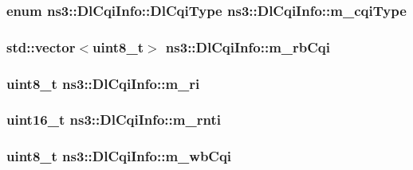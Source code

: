 \subsubsection[{\texorpdfstring{m\+\_\+cqi\+Type}{m_cqiType}}]{\setlength{\rightskip}{0pt plus 5cm}enum {\bf ns3\+::\+Dl\+Cqi\+Info\+::\+Dl\+Cqi\+Type}  ns3\+::\+Dl\+Cqi\+Info\+::m\+\_\+cqi\+Type}\hypertarget{structns3_1_1DlCqiInfo_acd41b20c81bf99ae02444c1f0d1a06ca}{}\label{structns3_1_1DlCqiInfo_acd41b20c81bf99ae02444c1f0d1a06ca}
\subsubsection[{\texorpdfstring{m\+\_\+rb\+Cqi}{m_rbCqi}}]{\setlength{\rightskip}{0pt plus 5cm}std\+::vector$<$uint8\+\_\+t$>$ ns3\+::\+Dl\+Cqi\+Info\+::m\+\_\+rb\+Cqi}\hypertarget{structns3_1_1DlCqiInfo_a326df5503df15cf8a108430902eaf022}{}\label{structns3_1_1DlCqiInfo_a326df5503df15cf8a108430902eaf022}
\subsubsection[{\texorpdfstring{m\+\_\+ri}{m_ri}}]{\setlength{\rightskip}{0pt plus 5cm}uint8\+\_\+t ns3\+::\+Dl\+Cqi\+Info\+::m\+\_\+ri}\hypertarget{structns3_1_1DlCqiInfo_aa772ec4b65a8ef85b674eb9d7940436b}{}\label{structns3_1_1DlCqiInfo_aa772ec4b65a8ef85b674eb9d7940436b}
\subsubsection[{\texorpdfstring{m\+\_\+rnti}{m_rnti}}]{\setlength{\rightskip}{0pt plus 5cm}uint16\+\_\+t ns3\+::\+Dl\+Cqi\+Info\+::m\+\_\+rnti}\hypertarget{structns3_1_1DlCqiInfo_ac255e44a52e27fa8b181f8b4fa627358}{}\label{structns3_1_1DlCqiInfo_ac255e44a52e27fa8b181f8b4fa627358}
\subsubsection[{\texorpdfstring{m\+\_\+wb\+Cqi}{m_wbCqi}}]{\setlength{\rightskip}{0pt plus 5cm}uint8\+\_\+t ns3\+::\+Dl\+Cqi\+Info\+::m\+\_\+wb\+Cqi}\hypertarget{structns3_1_1DlCqiInfo_a6a834558ac211bd60a79b88ce2b9d205}{}\label{structns3_1_1DlCqiInfo_a6a834558ac211bd60a79b88ce2b9d205}
